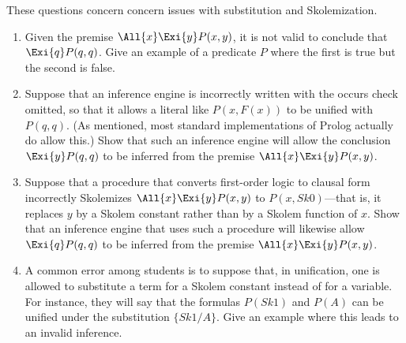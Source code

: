 \begin{exercise}
These questions concern concern issues with substitution and Skolemization.
\begin{enumerate}
\item Given the premise $\All{x} \Exi{y} P(x,y)$, it is not valid to 
conclude that $\Exi{q} P(q,q)$. Give an example of a predicate $P$ where
the first is true but the second is false.
\item Suppose that an inference engine is incorrectly written with the
occurs check omitted, 
so that it allows a literal like $P(x,F(x))$ to be unified with $P(q,q)$.
(As mentioned, most standard implementations of Prolog actually do allow this.) 
Show that such an inference engine will allow the conclusion
$\Exi{y} P(q,q)$ to be inferred from the premise $\All{x} \Exi{y} P(x,y)$.
\item
Suppose that a procedure that converts first-order logic to clausal form
incorrectly Skolemizes $\All{x} \Exi{y} P(x,y)$ to $P(x,Sk0)$---that is, it
replaces $y$ by a Skolem constant rather than by a Skolem function of $x$.
Show that an inference engine that uses such a procedure will likewise allow
$\Exi{q} P(q,q)$ to be inferred from the premise $\All{x} \Exi{y} P(x,y)$.
\item
A common error among students is to suppose that, in unification, one is 
allowed to substitute a term for a Skolem constant instead of for a variable.
For instance, they will say that the formulas $P(Sk1)$ and $P(A)$ can be 
unified
under the substitution $\{ Sk1/A \}$. Give an example where this leads to an
invalid inference.
\end{enumerate}
\end{exercise} 



